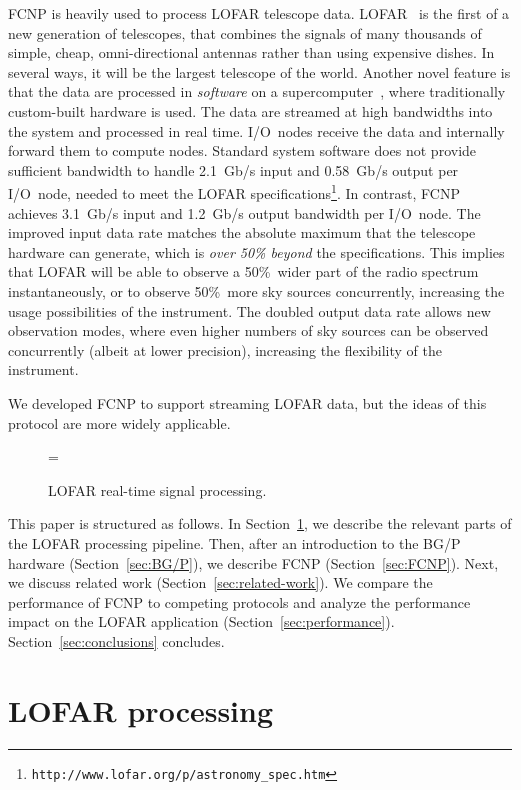 \documentclass[journal]{IEEEtran}
\begin{document}
FCNP is heavily used to process LOFAR telescope data.
LOFAR~\cite{Butcher:04,deVos:09} is the first of a new generation of
telescopes, that
combines the signals of many thousands of simple, cheap, omni-directional
antennas rather than using expensive dishes.
In several ways, it will be the largest telescope of the world.
Another novel feature is that the data are processed in \emph{software\/} on a
supercomputer~\cite{Romein:06}, where traditionally custom-built hardware is
used.
The data are streamed at high bandwidths into the system and processed in real
time.
I/O~nodes receive the data and internally forward them to compute nodes.
Standard system software does not provide sufficient bandwidth to handle
2.1~Gb/s input and 0.58~Gb/s output per I/O~node, needed to meet the LOFAR
specifications\footnote{\texttt{http://www.lofar.org/p/astronomy\_spec.htm}}.
In contrast, FCNP achieves 3.1~Gb/s input and 1.2~Gb/s output bandwidth per
I/O~node.
The improved input data rate matches the absolute maximum that the telescope
hardware can generate, which is \emph{over 50\% beyond\/} the specifications.
This implies that LOFAR will be able to observe a 50\%~wider part of the radio
spectrum instantaneously, or to observe 50\%~more sky sources concurrently,
increasing the usage possibilities of the instrument.
The doubled output data rate allows new observation modes, where even higher
numbers of sky sources can be observed concurrently (albeit at lower
precision), increasing the flexibility of the instrument.

We developed FCNP to support streaming LOFAR data,
but the ideas of this protocol are more widely applicable.

\addtocounter{figure}{1}
\begin{figure*}[t]
\epsfxsize=\textwidth
{}
\caption{LOFAR real-time signal processing.}
\label{fig:processing}
\end{figure*}

This paper is structured as follows.
In Section~\ref{sec:LOFAR}, we describe the relevant parts of the LOFAR
processing pipeline.
Then, after an introduction to the BG/P
hardware (Section~\ref{sec:BG/P}), we describe FCNP (Section~\ref{sec:FCNP}).
Next, we discuss related work (Section~\ref{sec:related-work}).
We compare the performance of FCNP to competing protocols and analyze the
performance impact on the LOFAR application (Section~\ref{sec:performance}).
Section~\ref{sec:conclusions} concludes.



\section{LOFAR processing}
\label{sec:LOFAR}
\end{document}

